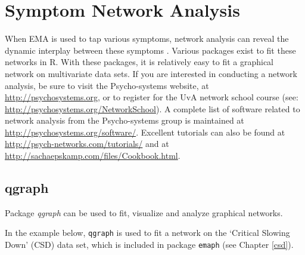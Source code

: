 \documentclass[]{book}
\begin{document}
\section{Symptom Network Analysis}\label{symptom-network-analysis}

 

When EMA is used to tap various symptoms, network analysis can reveal
the dynamic interplay between these symptoms
\citep{Borsboom2013, Borsboom2017, Bringmann2015}. Various packages
exist to fit these networks in R. With these packages, it is relatively
easy to fit a graphical network on multivariate data sets. If you are
interested in conducting a network analysis, be sure to visit the
Psycho-systems website, at \url{http://psychosystems.org}, or to
register for the UvA network school course (see:
\url{http://psychosystems.org/NetworkSchool}). A complete list of
software related to network analysis from the Psycho-systems group is
maintained at \url{http://psychosystems.org/software/}. Excellent
tutorials can also be found at
\url{http://psych-networks.com/tutorials/} and at
\url{http://sachaepskamp.com/files/Cookbook.html}.

\subsection{qgraph}\label{qgraph}


Package \emph{qgraph} \citep{Epskamp2012} can be used to fit, visualize
and analyze graphical networks.

In the example below, \texttt{qgraph} is used to fit a network on the
`Critical Slowing Down' (CSD) data set, which is included in package
\texttt{emaph} (see Chapter \ref{csd}).
\end{document}

